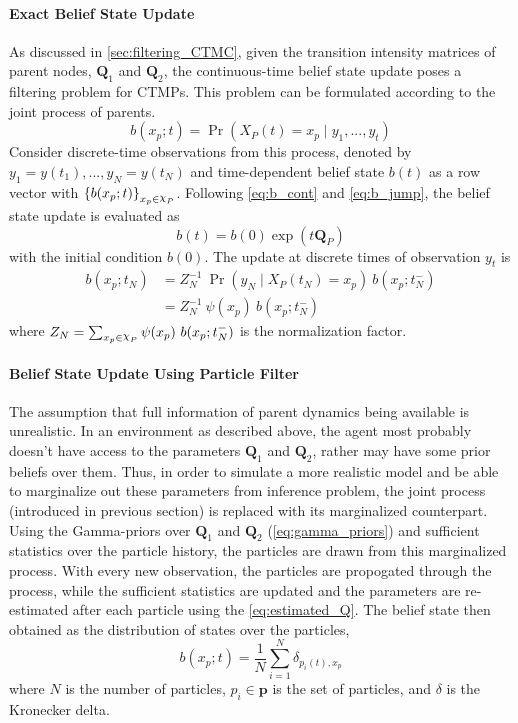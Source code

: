 \paragraph*{Exact Belief State Update}
\label{par:bs_exact}
As discussed in \cref{sec:filtering_CTMC}, given the transition intensity matrices of parent nodes, $ \textbf{Q}_1 $ and $ \textbf{Q}_2 $, the continuous-time belief state update poses a filtering problem for CTMPs. This problem can be formulated according to the joint process of parents.
\begin{equation}
b(x_p; t) = \operatorname{Pr}( X_P(t) = x_{p} \mid y_{1}, ..., y_{t})
\end{equation}
Consider discrete-time observations from this process, denoted by $ y_{1}=y(t_{1}), ..., y_{N}=y(t_{N}) $ and time-dependent belief state $ b(t) $ as a row vector with $ \left\lbrace b(x_p;t)\right\rbrace_{x_p \in \rchi_P} $. Following \autoref{eq:b_cont} and \autoref{eq:b_jump}, the belief state update is evaluated as
\begin{equation}
b(t) = b(0) \exp(t\textbf{Q}_P)
\end{equation}
with the initial condition $ b(0) $.
The update at discrete times of observation $ y_{t} $ is
\begin{align}
b(x_p; t_{N}) &= Z_{N}^{-1}\ {\operatorname{Pr}(y_{N} \mid X_P(t_{N})=x_p)}\ {b(x_p; t_{N}^{-})} \\ & = Z_{N}^{-1}\ \psi(x_p) \ {b(x_p; t_{N}^{-})}
\label{eq:bs_exact}
\end{align}
where $ Z_{N} = \sum_{x_p\in \rchi_P} \psi(x_p)\ b(x_p; t_{N}^{-}) $ is the normalization factor.
\paragraph*{Belief State Update Using Particle Filter}
\label{par:bs_partFilt}
The assumption that full information of parent dynamics being available is unrealistic. In an environment as described above, the agent most probably doesn't have access to the parameters $ \textbf{Q}_1 $ and $ \textbf{Q}_2 $, rather may have some prior beliefs over them. Thus, in order to simulate a more realistic model and be able to marginalize out these parameters from inference problem, the joint process (introduced in previous section) is replaced with its marginalized counterpart. Using the Gamma-priors over $ \textbf{Q}_1 $ and $ \textbf{Q}_2 $ (\autoref{eq:gamma_priors}) and sufficient statistics over the particle history, the particles are drawn from this marginalized process. With every new observation, the particles are propogated through the process, while the sufficient statistics are updated and the parameters are re-estimated after each particle using the \autoref{eq:estimated_Q}. The belief state then obtained as the distribution of states over the particles,
\begin{equation}
b(x_p; t) = \frac{1}{N} \sum_{i=1}^{N} \delta_{p_i(t), x_p}
\end{equation}
where $ N $ is the number of particles, $ p_i \in \textbf{p} $ is the set of particles, and $\delta$ is the Kronecker delta.

